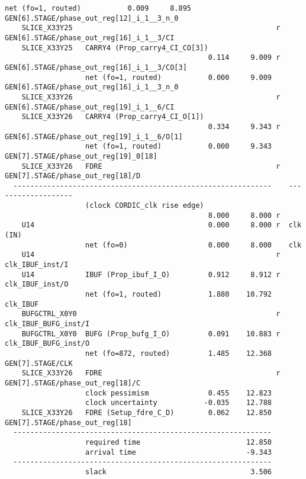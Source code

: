 \begin{Verbatim}[fontsize=\footnotesize,xleftmargin=-3.6cm]
                   net (fo=1, routed)           0.009     8.895    GEN[6].STAGE/phase_out_reg[12]_i_1__3_n_0
    SLICE_X33Y25                                                r  GEN[6].STAGE/phase_out_reg[16]_i_1__3/CI
    SLICE_X33Y25   CARRY4 (Prop_carry4_CI_CO[3])
                                                0.114     9.009 r  GEN[6].STAGE/phase_out_reg[16]_i_1__3/CO[3]
                   net (fo=1, routed)           0.000     9.009    GEN[6].STAGE/phase_out_reg[16]_i_1__3_n_0
    SLICE_X33Y26                                                r  GEN[6].STAGE/phase_out_reg[19]_i_1__6/CI
    SLICE_X33Y26   CARRY4 (Prop_carry4_CI_O[1])
                                                0.334     9.343 r  GEN[6].STAGE/phase_out_reg[19]_i_1__6/O[1]
                   net (fo=1, routed)           0.000     9.343    GEN[7].STAGE/phase_out_reg[19]_0[18]
    SLICE_X33Y26   FDRE                                         r  GEN[7].STAGE/phase_out_reg[18]/D
  -------------------------------------------------------------    -------------------
                   (clock CORDIC_clk rise edge)
                                                8.000     8.000 r
    U14                                         0.000     8.000 r  clk (IN)
                   net (fo=0)                   0.000     8.000    clk
    U14                                                         r  clk_IBUF_inst/I
    U14            IBUF (Prop_ibuf_I_O)         0.912     8.912 r  clk_IBUF_inst/O
                   net (fo=1, routed)           1.880    10.792    clk_IBUF
    BUFGCTRL_X0Y0                                               r  clk_IBUF_BUFG_inst/I
    BUFGCTRL_X0Y0  BUFG (Prop_bufg_I_O)         0.091    10.883 r  clk_IBUF_BUFG_inst/O
                   net (fo=872, routed)         1.485    12.368    GEN[7].STAGE/CLK
    SLICE_X33Y26   FDRE                                         r  GEN[7].STAGE/phase_out_reg[18]/C
                   clock pessimism              0.455    12.823
                   clock uncertainty           -0.035    12.788
    SLICE_X33Y26   FDRE (Setup_fdre_C_D)        0.062    12.850    GEN[7].STAGE/phase_out_reg[18]
  -------------------------------------------------------------
                   required time                         12.850
                   arrival time                          -9.343
  -------------------------------------------------------------
                   slack                                  3.506
\end{Verbatim}
